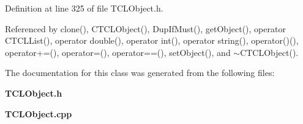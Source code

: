 Definition at line 325 of file TCLObject.h.

Referenced by clone(), CTCLObject(), Dup\-If\-Must(), get\-Object(), operator CTCLList(), operator double(), operator int(), operator string(), operator()(), operator+=(), operator=(), operator==(), set\-Object(), and $\sim$CTCLObject().

The documentation for this class was generated from the following files:\begin{CompactItemize}
\item 
{\bf TCLObject.h}\item 
{\bf TCLObject.cpp}\end{CompactItemize}
